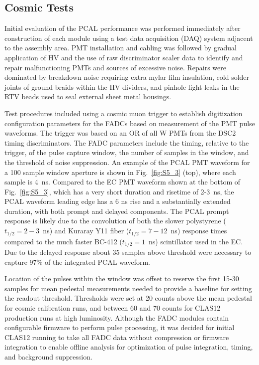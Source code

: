 \subsection{Cosmic Tests}

\label{CRT}

Initial evaluation of the PCAL performance was performed immediately after construction of each module using a
test data acquisition (DAQ) system adjacent to the assembly area. PMT installation and cabling was followed by
gradual application of HV and the use of raw discriminator scaler data to identify and repair malfunctioning PMTs
and sources of excessive noise. Repairs were dominated by breakdown noise requiring extra mylar film insulation,
cold solder joints of ground braids within the HV dividers, and pinhole light leaks in the RTV beads used to seal
external sheet metal housings. 

Test procedures included using a cosmic muon trigger to establish digitization configuration parameters for the FADCs based on
measurement of the PMT pulse waveforms.  The trigger was based on an OR of all W PMTs from the DSC2 timing discriminators.
The FADC parameters include the timing, relative to the trigger, of the pulse capture window, the number of samples in the window, and the threshold of noise suppression.  An example of the PCAL PMT waveform for a 100 sample window aperture is shown in Fig.~\ref{fig:S5_3} (top), where each sample is 4~ns. Compared to the EC PMT waveform shown at the bottom of Fig.~\ref{fig:S5_3}, which has a very short duration and risetime of 2-3~ns, the PCAL waveform leading edge has a 6 ns rise and a substantially extended duration, with both prompt and delayed components. The PCAL prompt response is likely due to the convolution of both the slower polystyrene ($t_{1/2}=2-3$~ns) and Kuraray Y11 fiber ($t_{1/2}=7-12$~ns) response times compared
to the much faster BC-412 ($t_{1/2}=1$~ns) scintillator used in the EC. Due to the delayed response about 35
samples above threshold were necessary to capture 97$\%$ of the integrated PCAL waveform.  

Location of the pulses within the window was offset to reserve the first 15-30 samples for mean pedestal measurements needed
to provide a baseline for setting the readout threshold. Thresholds were set at 20 counts above the mean
pedestal for cosmic calibration runs, and between 60 and 70 counts for CLAS12 production runs at high luminosity. Although the FADC modules contain configurable firmware to perform pulse processing, it was decided for initial CLAS12 running to take all FADC data without compression or firmware integration to enable offline analysis for
optimization of pulse integration, timing, and background suppression.

